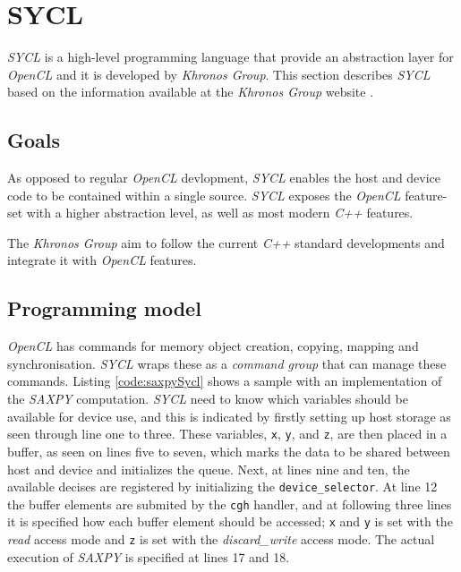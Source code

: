 \section{SYCL}
\textit{SYCL} is a high-level programming language that provide an abstraction layer for \textit{OpenCL} and it is developed by \textit{Khronos Group}. This section describes \textit{SYCL} based on the information available at the \textit{Khronos Group} website \cite{khronosSYCL}.

\subsection{Goals}
As opposed to regular \textit{OpenCL} devlopment, \textit{SYCL} enables the host and device code to be contained within a single source. \textit{SYCL} exposes the \textit{OpenCL} feature-set with a higher abstraction level, as well as most modern \textit{C++} features. 

The \textit{Khronos Group} aim to follow the current \textit{C++} standard developments and integrate it with \textit{OpenCL} features.

\subsection{Programming model}
\textit{OpenCL} has commands for memory object creation, copying, mapping and synchronisation. \textit{SYCL} wraps these as a \textit{command group} that can manage these commands. Listing \ref{code:saxpySycl} shows a sample with an implementation of the \textit{SAXPY} computation. \textit{SYCL} need to know which variables should be available for device use, and this is indicated by firstly setting up host storage as seen through line one to three. These variables, \texttt{x}, \texttt{y}, and \texttt{z}, are then placed in a buffer, as seen on lines five to seven, which marks the data to be shared between host and device and initializes the queue. Next, at lines nine and ten, the available decises are registered by initializing the \texttt{device\_selector}. At line 12 the buffer elements are submited by the \texttt{cgh} handler, and at following three lines it is specified how each buffer element should be accessed; \texttt{x} and \texttt{y} is set with the \textit{read} access mode and \texttt{z} is set with the \textit{discard\_write} access mode. The actual execution of \textit{SAXPY} is specified at lines 17 and 18.

